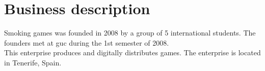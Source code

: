 \chapter{Business description}
Smoking games was founded in 2008 by a group of 5 international students. The founders met at guc during
the 1st semester of 2008. \\
This enterprise produces and digitally distributes games. The enterprise is located in Tenerife, Spain.





